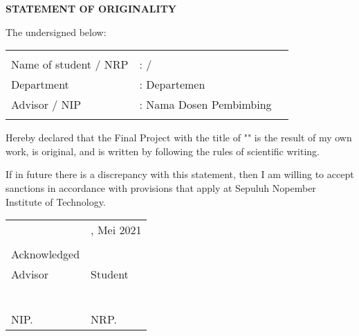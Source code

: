 \begin{center}
  \large
  \textbf{STATEMENT OF ORIGINALITY}
\end{center}

\thispagestyle{empty}

\vspace{2ex}


\noindent The undersigned below:

\noindent\begin{tabularx}{\textwidth}{X X l}
                        &                         \\
  Name of student / NRP & : \name{} / \nrp{}      \\
  Department            & : Departemen            \\
  Advisor / NIP         & : Nama Dosen Pembimbing \\
                        &                         \\
\end{tabularx}

Hereby declared that the Final Project with the title of "" is the result of my own work, is original, and is written by following the rules of scientific writing.

If in future there is a discrepancy with this statement, then I am willing to accept sanctions in accordance with provisions that apply at Sepuluh Nopember Institute of Technology.

\vspace{8ex}

\noindent\begin{tabularx}{\textwidth}{X l}
                     & \place{}, Mei 2021 \\
                     &                    \\
  Acknowledged       &                    \\
  Advisor            & Student            \\
                     &                    \\
                     &                    \\
                     &                    \\
                     &                    \\
                     &                    \\
  \advisor{}         & \name{}            \\
  NIP. \advisornip{} & NRP. \nrp{}        \\
\end{tabularx}